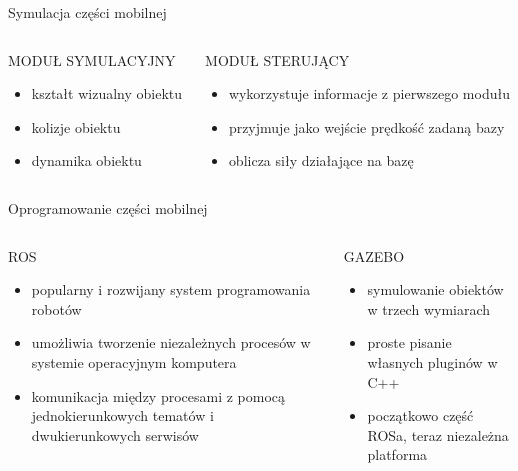 \begin{frame}{Symulacja części mobilnej}
	\begin{columns}
		\begin{column}{0.5\textwidth}
			\begin{center}
				MODUŁ SYMULACYJNY
			\end{center}
			\begin{itemize}
				\item kształt wizualny obiektu
				\item kolizje obiektu
				\item dynamika obiektu
			\end{itemize}
			
		\end{column}
		\begin{column}{0.5\textwidth}  %
			\begin{center}
				MODUŁ STERUJĄCY
			\end{center}
			\begin{itemize}
				\item wykorzystuje informacje z pierwszego modułu
				\item przyjmuje jako wejście prędkość zadaną bazy
				\item oblicza siły działające na bazę
			\end{itemize}
		\end{column}
	\end{columns}
\end{frame}

\begin{frame}{Oprogramowanie części mobilnej}
	\begin{columns}
		\begin{column}{0.5\textwidth}
			\begin{center}
				ROS
			\end{center}
			\begin{itemize}
				\item popularny i rozwijany system programowania robotów
				\item umożliwia tworzenie niezależnych procesów w systemie operacyjnym komputera
				\item komunikacja między procesami z pomocą jednokierunkowych tematów i dwukierunkowych serwisów
			\end{itemize}
			
		\end{column}
		\begin{column}{0.5\textwidth}  %
			\begin{center}
				GAZEBO
			\end{center}
			\begin{itemize}
				\item symulowanie obiektów w trzech wymiarach
				\item proste pisanie własnych pluginów w C++
				\item początkowo część ROSa, teraz niezależna platforma
			\end{itemize}
		\end{column}
	\end{columns}
\end{frame}